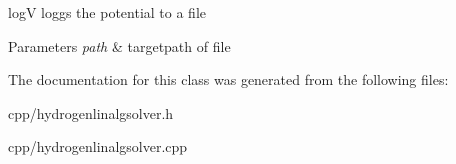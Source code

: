 log\-V loggs the potential to a file 


\begin{DoxyParams}{Parameters}
{\em path} & targetpath of file \\
\hline
\end{DoxyParams}


The documentation for this class was generated from the following files\-:\begin{DoxyCompactItemize}
\item 
cpp/hydrogenlinalgsolver.\-h\item 
cpp/hydrogenlinalgsolver.\-cpp\end{DoxyCompactItemize}
